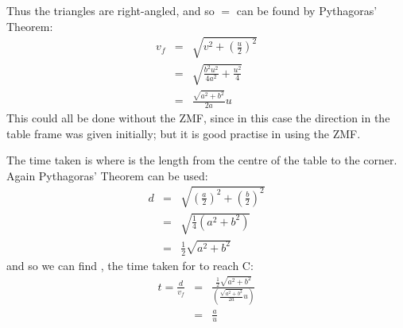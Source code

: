 \begin{problem}
{\begin{enumerate}
Thus the triangles are right-angled, and so  $=$  can be found by Pythagoras' Theorem:
\begin{eqnarray*} 
v_{f} &=& \sqrt{ v^{2} + \left(\frac{u}{2}\right)^{2}} \\ 
&=& \sqrt{ \frac{b^{2}u^{2}}{4a^{2}} + \frac{u^{2}}{4}} \\ 
&=& \frac{\sqrt{a^{2} + b^{2}}}{2a} u 
\end{eqnarray*}
This could all be done without the ZMF, since in this case the direction in the table frame was given initially; but it is good practise in using the ZMF.

The time taken is  where  is the length from the centre of the table to the corner. Again Pythagoras' Theorem can be used:
\begin{eqnarray*} 
d &=& \sqrt{ \left(\frac{a}{2}\right)^{2} + \left(\frac{b}{2}\right)^{2} } \\ 
&=& \sqrt{\frac{1}{4}(a^{2} + b^{2})} \\ 
&=& \frac{1}{2}\sqrt{a^{2} + b^{2}} 
\end{eqnarray*}
and so we can find , the time taken for  to reach C:
\begin{eqnarray*} 
t = \frac{d}{v_{f}} &=& \frac{\frac{1}{2}\sqrt{a^{2} + b^{2}}}{\left(\frac{\sqrt{a^{2} + b^{2}}}{2a} u\right)}\\
 &=& \frac{a}{u} 
\end{eqnarray*}

\end{enumerate}
}
\end{problem}